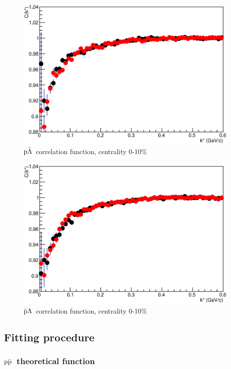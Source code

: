 \documentclass[ALICE,manyauthors]{ALICE_analysis_notes}
\newcommand{\pap}{$\rm p\bar{\rm p}$}
\newcommand{\pal}{$\rm p\bar{\rm \Lambda}$}
\newcommand{\apl}{$\bar{\rm p }\Lambda$}
\begin{document}
\begin{figure}[h!]
   \centering
   \includegraphics[width=0.99\textwidth]{pics/compPAL}
   \caption{ \pal~correlation function, centrality 0-10$\%$}
   \label{fig:palCorrFun}
 \end{figure}

\begin{figure}[h!]
   \centering
   \includegraphics[width=0.99\textwidth]{pics/compAPL}
   \caption{ \apl~correlation function, centrality 0-10$\%$}
   \label{fig:aplCorrFun}
 \end{figure}

\subsection{Fitting procedure}

\subsubsection{\pap~theoretical function}
\end{document}
